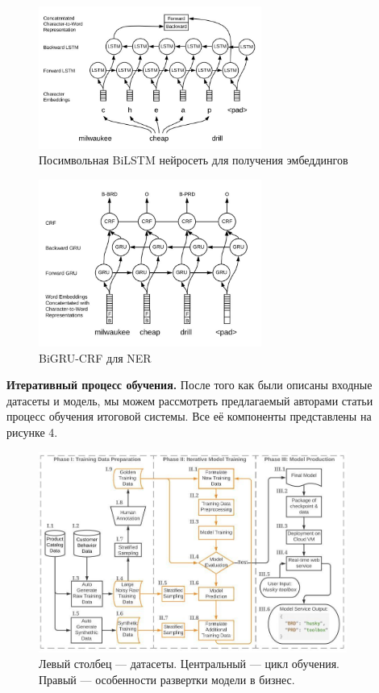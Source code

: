 \documentclass[12pt,a4paper]{article}
\begin{document}
\begin{figure}[H]
\begin{center}
  \includegraphics[width=0.65\textwidth]{pap_emb.jpg}
  \caption{Посимвольная BiLSTM нейросеть для получения эмбеддингов}
\end{center}
\end{figure}

\begin{figure}[H]
\begin{center}
  \includegraphics[width=0.65\textwidth]{pap_net.jpg}
  \caption{BiGRU-CRF для NER}
\end{center}
\end{figure}

\textbf{Итеративный процесс обучения.} После того как были описаны входные датасеты и модель, мы можем рассмотреть предлагаемый авторами статьи процесс обучения итоговой системы. Все её компоненты представлены на рисунке 4.

\begin{figure}[H]
\begin{center}
  \includegraphics[width=0.9\textwidth]{loop.jpg}
  \caption{Левый столбец --- датасеты. Центральный --- цикл обучения. Правый --- особенности развертки модели в бизнес.}
\end{center}
\end{figure}
\end{document}
